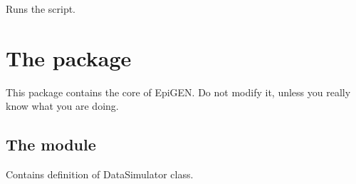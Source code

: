 \documentclass[a4paper,10pt,english]{sphinxhowto}
\begin{document}
\begin{fulllineitems}
\label{\detokenize{test_runtime:test_runtime.run_script}}
Runs the script.

\end{fulllineitems}



\section{The package }
\label{\detokenize{utils:the-package-utils}}\label{\detokenize{utils::doc}}
This package contains the core of EpiGEN. Do not modify it, unless you really know what you are doing.


\subsection{The module }
\label{\detokenize{utils:module-utils.data_simulator}}\label{\detokenize{utils:the-module-utils-data-simulator-py}}
Contains definition of DataSimulator class.
\end{document}
